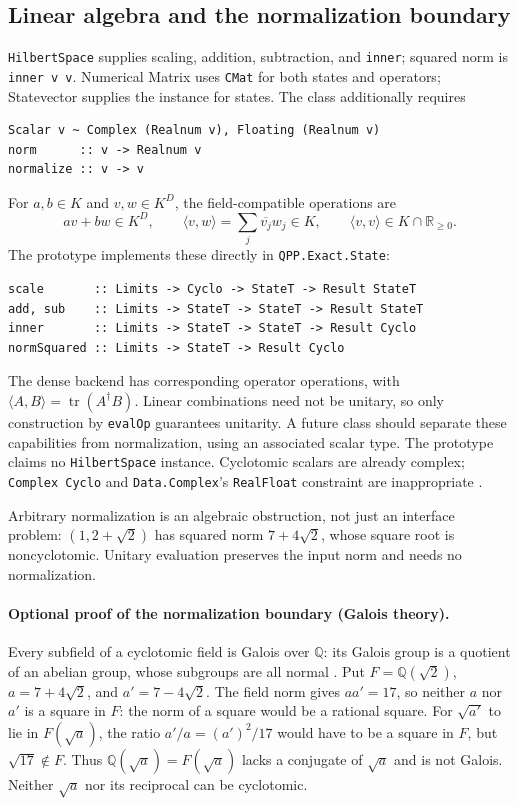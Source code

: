 \documentclass[11pt,a4paper]{article}
\newcommand{\Q}{\mathbb{Q}}
\newcommand{\code}[1]{\texttt{#1}}
\DeclareMathOperator{\tr}{tr}
\begin{document}
\subsection{Linear algebra and the normalization boundary}
\code{HilbertSpace} supplies scaling, addition, subtraction, and \code{inner};
squared norm is \code{inner v v}. Numerical Matrix uses \code{CMat} for
both states and operators; Statevector supplies the instance for states.
The class additionally requires
\begin{lstlisting}
Scalar v ~ Complex (Realnum v), Floating (Realnum v)
norm      :: v -> Realnum v
normalize :: v -> v
\end{lstlisting}
For $a,b\in K$ and $v,w\in K^D$, the field-compatible operations are
\[
av+bw\in K^D,\qquad
\langle v,w\rangle=\sum_j\overline{v_j}w_j\in K,\qquad
\langle v,v\rangle\in K\cap\mathbb R_{\ge0}.
\]
The prototype implements these directly in \code{QPP.Exact.State}:
\begin{lstlisting}
scale       :: Limits -> Cyclo -> StateT -> Result StateT
add, sub    :: Limits -> StateT -> StateT -> Result StateT
inner       :: Limits -> StateT -> StateT -> Result Cyclo
normSquared :: Limits -> StateT -> Result Cyclo
\end{lstlisting}
The dense backend has corresponding operator operations, with
$\langle A,B\rangle=\tr(A^\dagger B)$. Linear combinations need not be
unitary, so only construction by \code{evalOp} guarantees unitarity.
A future class should separate these capabilities from normalization,
using an associated scalar type. The prototype claims no \code{HilbertSpace}
instance. Cyclotomic scalars are already complex; \code{Complex Cyclo}
and \code{Data.Complex}'s \code{RealFloat} constraint are inappropriate
\cite{base}.

Arbitrary normalization is an algebraic obstruction, not just an interface
problem: $(1,2+\sqrt2)$ has squared norm $7+4\sqrt2$, whose square root
is noncyclotomic. Unitary evaluation preserves the input norm and needs
no normalization.

\paragraph{Optional proof of the normalization boundary (Galois theory).}
Every subfield of a cyclotomic field is Galois over $\Q$: its Galois group
is a quotient of an abelian group, whose subgroups are all normal
\cite{milne}. Put $F=\Q(\sqrt2)$, $a=7+4\sqrt2$, and $a'=7-4\sqrt2$.
The field norm gives $aa'=17$, so neither $a$ nor $a'$ is a square in $F$:
the norm of a square would be a rational square.
For $\sqrt{a'}$ to lie in $F(\sqrt a)$, the ratio
$a'/a=(a')^2/17$ would have to be a square in $F$, but $\sqrt{17}\notin F$.
Thus $\Q(\sqrt a)=F(\sqrt a)$ lacks a conjugate of $\sqrt a$ and is not
Galois. Neither $\sqrt a$ nor its reciprocal can be cyclotomic.
\label{sec:normalization}
\end{document}
